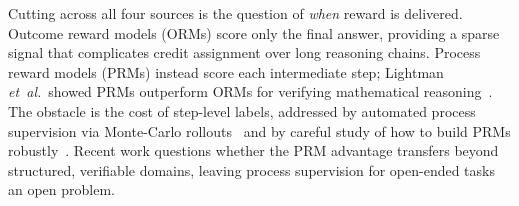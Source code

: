 Cutting across all four sources is the question of \emph{when} reward is
delivered.  Outcome reward models (ORMs) score only the final answer,
providing a sparse signal that complicates credit assignment over long
reasoning chains.  Process reward models (PRMs) instead score each
intermediate step; Lightman \textit{et~al.}\ showed PRMs outperform ORMs
for verifying mathematical reasoning~\cite{lightman2023verify}.  The
obstacle is the cost of step-level labels, addressed by automated process
supervision via Monte-Carlo rollouts~\cite{wang2024omegaprm} and by
careful study of how to build PRMs robustly~\cite{luo2025prmlessons}.
Recent work questions whether the PRM advantage transfers beyond
structured, verifiable domains, leaving process supervision for
open-ended tasks an open problem.
